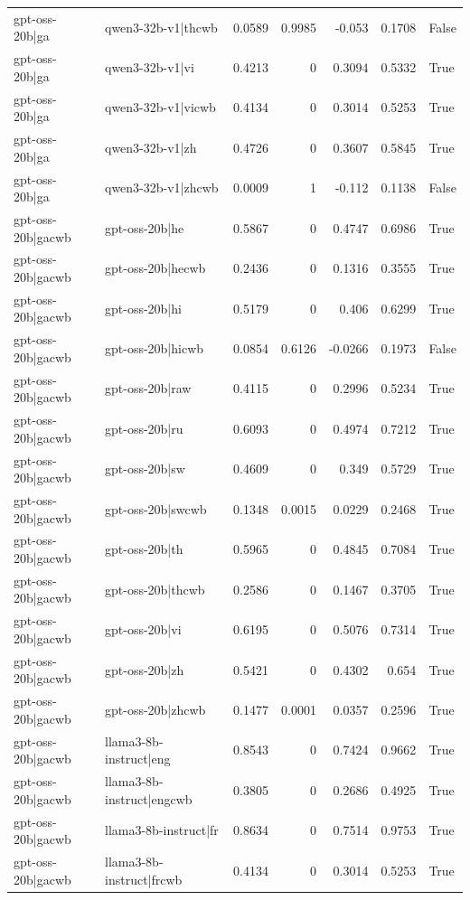 \begin{table}
\begin{tabular}{l l r r r r l}
gpt-oss-20b|ga & qwen3-32b-v1|thcwb & 0.0589 & 0.9985 & -0.053 & 0.1708 & False \\
gpt-oss-20b|ga & qwen3-32b-v1|vi & 0.4213 & 0 & 0.3094 & 0.5332 & True \\
gpt-oss-20b|ga & qwen3-32b-v1|vicwb & 0.4134 & 0 & 0.3014 & 0.5253 & True \\
gpt-oss-20b|ga & qwen3-32b-v1|zh & 0.4726 & 0 & 0.3607 & 0.5845 & True \\
gpt-oss-20b|ga & qwen3-32b-v1|zhcwb & 0.0009 & 1 & -0.112 & 0.1138 & False \\
gpt-oss-20b|gacwb & gpt-oss-20b|he & 0.5867 & 0 & 0.4747 & 0.6986 & True \\
gpt-oss-20b|gacwb & gpt-oss-20b|hecwb & 0.2436 & 0 & 0.1316 & 0.3555 & True \\
gpt-oss-20b|gacwb & gpt-oss-20b|hi & 0.5179 & 0 & 0.406 & 0.6299 & True \\
gpt-oss-20b|gacwb & gpt-oss-20b|hicwb & 0.0854 & 0.6126 & -0.0266 & 0.1973 & False \\
gpt-oss-20b|gacwb & gpt-oss-20b|raw & 0.4115 & 0 & 0.2996 & 0.5234 & True \\
gpt-oss-20b|gacwb & gpt-oss-20b|ru & 0.6093 & 0 & 0.4974 & 0.7212 & True \\
gpt-oss-20b|gacwb & gpt-oss-20b|sw & 0.4609 & 0 & 0.349 & 0.5729 & True \\
gpt-oss-20b|gacwb & gpt-oss-20b|swcwb & 0.1348 & 0.0015 & 0.0229 & 0.2468 & True \\
gpt-oss-20b|gacwb & gpt-oss-20b|th & 0.5965 & 0 & 0.4845 & 0.7084 & True \\
gpt-oss-20b|gacwb & gpt-oss-20b|thcwb & 0.2586 & 0 & 0.1467 & 0.3705 & True \\
gpt-oss-20b|gacwb & gpt-oss-20b|vi & 0.6195 & 0 & 0.5076 & 0.7314 & True \\
gpt-oss-20b|gacwb & gpt-oss-20b|zh & 0.5421 & 0 & 0.4302 & 0.654 & True \\
gpt-oss-20b|gacwb & gpt-oss-20b|zhcwb & 0.1477 & 0.0001 & 0.0357 & 0.2596 & True \\
gpt-oss-20b|gacwb & llama3-8b-instruct|eng & 0.8543 & 0 & 0.7424 & 0.9662 & True \\
gpt-oss-20b|gacwb & llama3-8b-instruct|engcwb & 0.3805 & 0 & 0.2686 & 0.4925 & True \\
gpt-oss-20b|gacwb & llama3-8b-instruct|fr & 0.8634 & 0 & 0.7514 & 0.9753 & True \\
gpt-oss-20b|gacwb & llama3-8b-instruct|frcwb & 0.4134 & 0 & 0.3014 & 0.5253 & True \\

\end{tabular}
\end{table}
